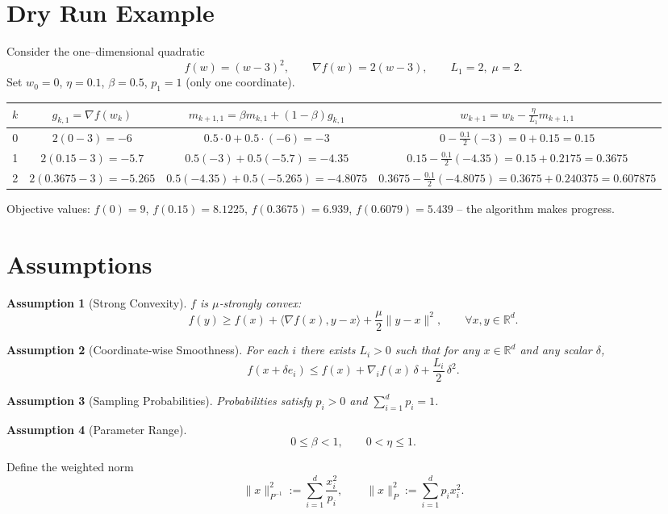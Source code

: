 \documentclass{article}
\newtheorem{assumption}{Assumption}
\newcommand{\R}{\mathbb{R}}
\begin{document}
\section*{Dry Run Example}
Consider the one–dimensional quadratic
\[
f(w)=(w-3)^2,
\qquad \nabla f(w)=2(w-3),\qquad L_1=2,\;\mu=2.
\]
Set $w_0=0$, $\eta=0.1$, $\beta=0.5$, $p_1=1$ (only one coordinate).  

\begin{center}
\begin{tabular}{c|c|c|c}
$k$ & $g_{k,1}= \nabla f(w_k)$ & $m_{k+1,1}= \beta m_{k,1}+(1-\beta)g_{k,1}$ & $w_{k+1}= w_k-\frac{\eta}{L_1}m_{k+1,1}$ \\ \hline
0 & $2(0-3)=-6$ & $0.5\cdot0+0.5\cdot(-6)=-3$ & $0-\frac{0.1}{2}(-3)=0+0.15=0.15$ \\[4pt]
1 & $2(0.15-3)=-5.7$ & $0.5(-3)+0.5(-5.7)=-4.35$ & $0.15-\frac{0.1}{2}(-4.35)=0.15+0.2175=0.3675$ \\[4pt]
2 & $2(0.3675-3)=-5.265$ & $0.5(-4.35)+0.5(-5.265)=-4.8075$ & $0.3675-\frac{0.1}{2}(-4.8075)=0.3675+0.240375=0.607875$
\end{tabular}
\end{center}
Objective values: $f(0)=9$, $f(0.15)=8.1225$, $f(0.3675)=6.939$, $f(0.6079)=5.439$ – the algorithm makes progress.

\section*{Assumptions}
\begin{assumption}[Strong Convexity]
$f$ is $\mu$‑strongly convex:
\[
f(y)\ge f(x)+\langle\nabla f(x),y-x\rangle+\frac{\mu}{2}\|y-x\|^2,
\qquad\forall x,y\in\R^d.
\tag{A1}
\]
\end{assumption}
\begin{assumption}[Coordinate‑wise Smoothness]
For each $i$ there exists $L_i>0$ such that for any $x\in\R^d$ and any scalar $\delta$,
\[
f(x+ \delta e_i)\le f(x)+\nabla_i f(x)\,\delta+\frac{L_i}{2}\,\delta^2 .
\tag{A2}
\]
\end{assumption}
\begin{assumption}[Sampling Probabilities]
Probabilities satisfy $p_i>0$ and $\sum_{i=1}^d p_i=1$.
\end{assumption}
\begin{assumption}[Parameter Range]
\[
0\le\beta<1,\qquad 0<\eta\le 1.
\tag{A4}
\]
\end{assumption}

Define the weighted norm
\[
\|x\|_{P^{-1}}^2:=\sum_{i=1}^d\frac{x_i^2}{p_i},
\qquad
\|x\|_{P}^2:=\sum_{i=1}^d p_i x_i^2 .
\]
\end{document}
